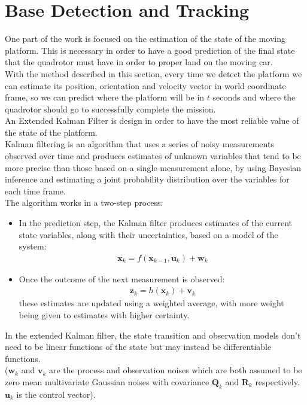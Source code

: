 \chapter{Base Detection and Tracking}\label{chap:base_tracking}
One part of the work is focused on the estimation of the state of the moving platform. This is necessary in order to have a good prediction of the final state that the quadrotor must have in order to proper land on the moving car. \\ With the method described in this section, every time we detect the platform we can estimate its position, orientation and velocity vector in world coordinate frame, so we can predict where the platform will be in $t$ seconds and where the quadrotor should go to successfully complete the mission.\\ 


An Extended Kalman Filter  \cite{kalmanfilter} is design in order to have the most reliable value of the state of the platform.\\
Kalman filtering is an algorithm that uses a series of noisy measurements observed over time and produces estimates of unknown variables that tend to be more precise than those based on a single measurement alone, by using Bayesian inference and estimating a joint probability distribution over the variables for each time frame.\\
The algorithm works in a two-step process:
\begin{itemize}
\item In the prediction step, the Kalman filter produces estimates of the current state variables, along with their uncertainties, based on a model of the system:
\begin{align}
\boldsymbol{x}_k = f(\boldsymbol{x}_{k-1},\boldsymbol{u}_k) + \boldsymbol{w}_k
 \label{eq:ekf1}
\end{align}
\item Once the outcome of the next measurement is observed:
\begin{align}
\boldsymbol{z}_k = h(\boldsymbol{x}_{k}) + \boldsymbol{v}_k
 \label{eq:ekf2}
\end{align}
these estimates are updated using a weighted average, with more weight being given to estimates with higher certainty.
\end{itemize}
In the extended Kalman filter, the state transition and observation models don't need to be linear functions of the state but may instead be differentiable functions.\\
($\boldsymbol{w}_k$ and $\boldsymbol{v}_k$ are the process and observation noises which are both assumed to be zero mean multivariate Gaussian noises with covariance $\boldsymbol{Q}_k$ and $\boldsymbol{R}_k$ respectively. $\boldsymbol{u}_k$ is the control vector).

